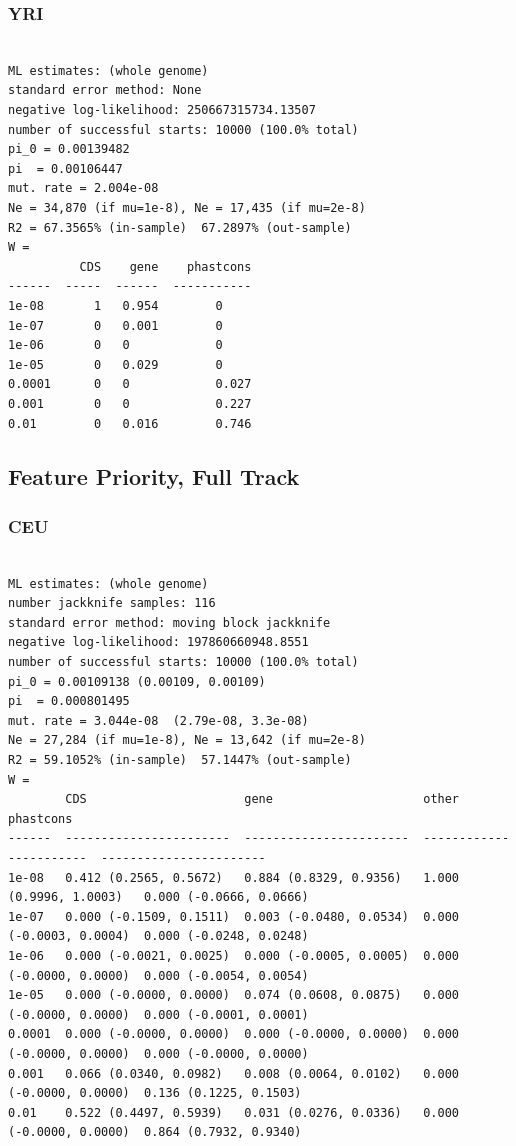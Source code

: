 \documentclass[11pt]{article}
\begin{document}
\subsubsection*{YRI}
\begin{minipage}{\linewidth}\begin{footnotesize}
\begin{verbatim}

ML estimates: (whole genome)
standard error method: None
negative log-likelihood: 250667315734.13507
number of successful starts: 10000 (100.0% total)
pi_0 = 0.00139482
pi  = 0.00106447
mut. rate = 2.004e-08 
Ne = 34,870 (if mu=1e-8), Ne = 17,435 (if mu=2e-8)
R2 = 67.3565% (in-sample)  67.2897% (out-sample)
W = 
          CDS    gene    phastcons
------  -----  ------  -----------
1e-08       1   0.954        0
1e-07       0   0.001        0
1e-06       0   0            0
1e-05       0   0.029        0
0.0001      0   0            0.027
0.001       0   0            0.227
0.01        0   0.016        0.746
\end{verbatim}
\end{footnotesize}\end{minipage}


\subsection{Feature Priority, Full Track}
\subsubsection*{CEU}
\begin{minipage}{\linewidth}\begin{footnotesize}
\begin{verbatim}

ML estimates: (whole genome)
number jackknife samples: 116
standard error method: moving block jackknife
negative log-likelihood: 197860660948.8551
number of successful starts: 10000 (100.0% total)
pi_0 = 0.00109138 (0.00109, 0.00109)
pi  = 0.000801495
mut. rate = 3.044e-08  (2.79e-08, 3.3e-08)
Ne = 27,284 (if mu=1e-8), Ne = 13,642 (if mu=2e-8)
R2 = 59.1052% (in-sample)  57.1447% (out-sample)
W = 
        CDS                      gene                     other                    phastcons
------  -----------------------  -----------------------  -----------------------  -----------------------
1e-08   0.412 (0.2565, 0.5672)   0.884 (0.8329, 0.9356)   1.000 (0.9996, 1.0003)   0.000 (-0.0666, 0.0666)
1e-07   0.000 (-0.1509, 0.1511)  0.003 (-0.0480, 0.0534)  0.000 (-0.0003, 0.0004)  0.000 (-0.0248, 0.0248)
1e-06   0.000 (-0.0021, 0.0025)  0.000 (-0.0005, 0.0005)  0.000 (-0.0000, 0.0000)  0.000 (-0.0054, 0.0054)
1e-05   0.000 (-0.0000, 0.0000)  0.074 (0.0608, 0.0875)   0.000 (-0.0000, 0.0000)  0.000 (-0.0001, 0.0001)
0.0001  0.000 (-0.0000, 0.0000)  0.000 (-0.0000, 0.0000)  0.000 (-0.0000, 0.0000)  0.000 (-0.0000, 0.0000)
0.001   0.066 (0.0340, 0.0982)   0.008 (0.0064, 0.0102)   0.000 (-0.0000, 0.0000)  0.136 (0.1225, 0.1503)
0.01    0.522 (0.4497, 0.5939)   0.031 (0.0276, 0.0336)   0.000 (-0.0000, 0.0000)  0.864 (0.7932, 0.9340)
\end{verbatim}
\end{footnotesize}\end{minipage}
\end{document}
